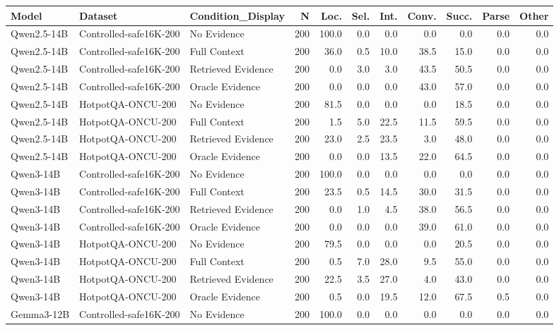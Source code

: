 \begin{tabular}{lllrrrrrrrr}
\toprule
Model & Dataset & Condition_Display & N & Loc. & Sel. & Int. & Conv. & Succ. & Parse & Other \\
\midrule
Qwen2.5-14B & Controlled-safe16K-200 & No Evidence & 200 & 100.0 & 0.0 & 0.0 & 0.0 & 0.0 & 0.0 & 0.0 \\
Qwen2.5-14B & Controlled-safe16K-200 & Full Context & 200 & 36.0 & 0.5 & 10.0 & 38.5 & 15.0 & 0.0 & 0.0 \\
Qwen2.5-14B & Controlled-safe16K-200 & Retrieved Evidence & 200 & 0.0 & 3.0 & 3.0 & 43.5 & 50.5 & 0.0 & 0.0 \\
Qwen2.5-14B & Controlled-safe16K-200 & Oracle Evidence & 200 & 0.0 & 0.0 & 0.0 & 43.0 & 57.0 & 0.0 & 0.0 \\
Qwen2.5-14B & HotpotQA-ONCU-200 & No Evidence & 200 & 81.5 & 0.0 & 0.0 & 0.0 & 18.5 & 0.0 & 0.0 \\
Qwen2.5-14B & HotpotQA-ONCU-200 & Full Context & 200 & 1.5 & 5.0 & 22.5 & 11.5 & 59.5 & 0.0 & 0.0 \\
Qwen2.5-14B & HotpotQA-ONCU-200 & Retrieved Evidence & 200 & 23.0 & 2.5 & 23.5 & 3.0 & 48.0 & 0.0 & 0.0 \\
Qwen2.5-14B & HotpotQA-ONCU-200 & Oracle Evidence & 200 & 0.0 & 0.0 & 13.5 & 22.0 & 64.5 & 0.0 & 0.0 \\
Qwen3-14B & Controlled-safe16K-200 & No Evidence & 200 & 100.0 & 0.0 & 0.0 & 0.0 & 0.0 & 0.0 & 0.0 \\
Qwen3-14B & Controlled-safe16K-200 & Full Context & 200 & 23.5 & 0.5 & 14.5 & 30.0 & 31.5 & 0.0 & 0.0 \\
Qwen3-14B & Controlled-safe16K-200 & Retrieved Evidence & 200 & 0.0 & 1.0 & 4.5 & 38.0 & 56.5 & 0.0 & 0.0 \\
Qwen3-14B & Controlled-safe16K-200 & Oracle Evidence & 200 & 0.0 & 0.0 & 0.0 & 39.0 & 61.0 & 0.0 & 0.0 \\
Qwen3-14B & HotpotQA-ONCU-200 & No Evidence & 200 & 79.5 & 0.0 & 0.0 & 0.0 & 20.5 & 0.0 & 0.0 \\
Qwen3-14B & HotpotQA-ONCU-200 & Full Context & 200 & 0.5 & 7.0 & 28.0 & 9.5 & 55.0 & 0.0 & 0.0 \\
Qwen3-14B & HotpotQA-ONCU-200 & Retrieved Evidence & 200 & 22.5 & 3.5 & 27.0 & 4.0 & 43.0 & 0.0 & 0.0 \\
Qwen3-14B & HotpotQA-ONCU-200 & Oracle Evidence & 200 & 0.5 & 0.0 & 19.5 & 12.0 & 67.5 & 0.5 & 0.0 \\
Gemma3-12B & Controlled-safe16K-200 & No Evidence & 200 & 100.0 & 0.0 & 0.0 & 0.0 & 0.0 & 0.0 & 0.0 \\

\end{tabular}
